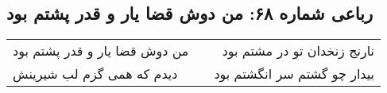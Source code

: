 \begin{center}
\section*{رباعی شماره ۶۸: من دوش قضا یار و قدر پشتم بود}
\label{sec:068}
\begin{longtable}{l p{0.5cm} r}
من دوش قضا یار و قدر پشتم بود
&&
نارنج زنخدان تو در مشتم بود
\\
دیدم که همی گزم لب شیرینش
&&
بیدار چو گشتم سر انگشتم بود
\\
\end{longtable}
\end{center}
